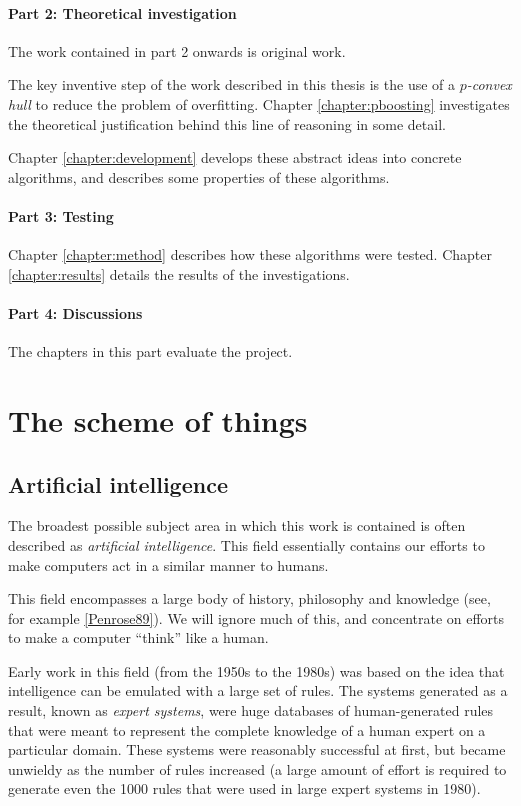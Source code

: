 \paragraph{Part 2: Theoretical investigation}

The work contained in part 2 onwards is original work.

The key inventive step of the work described in this thesis is the use of a
\emph{$p$-convex hull} to reduce the problem of overfitting.  Chapter
\ref{chapter:pboosting} investigates the theoretical justification
behind this line of reasoning in some detail.

Chapter \ref{chapter:development} develops these abstract ideas into
concrete algorithms, and describes some properties of these
algorithms.

\paragraph{Part 3: Testing}

Chapter \ref{chapter:method} describes how these algorithms were
tested.  Chapter \ref{chapter:results} details the results of the
investigations.

\paragraph{Part 4: Discussions}

The chapters in this part evaluate the project.

\section{The scheme of things}

\subsection{Artificial intelligence}

The broadest possible subject area in which this work is contained is
often described as \emph{artificial intelligence}.  This field
essentially contains our efforts to make computers act in a similar
manner to humans.

This field encompasses a large body of history, philosophy and
knowledge (see, for example \ref{Penrose89}).  We will ignore much
of this, and concentrate on efforts to make a computer ``think'' like
a human.

Early work in this field (from the 1950s to the 1980s) was based on
the idea that intelligence can be emulated with a large set of rules.
The systems generated as a result, known as \emph{expert systems},
were huge databases of human-generated rules that were meant to
represent the complete knowledge of a human expert on a particular
domain.  These systems were reasonably successful at first, but became
unwieldy as the number of rules increased (a large amount of effort is
required to generate even the 1000 rules that were used in large
expert systems in 1980). 

